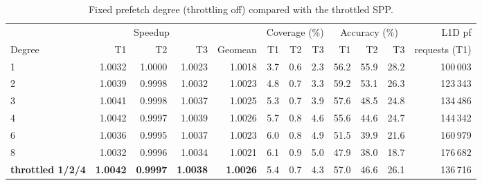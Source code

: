 \documentclass[11pt,a4paper]{article}
\begin{document}
\begin{table}[H]
    \centering
    \small
    \setlength{\tabcolsep}{3pt}
    \begin{tabular}{l rrr r rrr rrr r}
        \toprule
        & \multicolumn{3}{c}{Speedup} & & \multicolumn{3}{c}{Coverage (\%)} & \multicolumn{3}{c}{Accuracy (\%)} & L1D pf \\
        \cmidrule(lr){2-4}\cmidrule(lr){6-8}\cmidrule(lr){9-11}
        Degree & T1 & T2 & T3 & Geomean & T1 & T2 & T3 & T1 & T2 & T3 & requests (T1) \\
        \midrule
        1 & 1.0032 & 1.0000 & 1.0023 & 1.0018 & 3.7 & 0.6 & 2.3 & 56.2 & 55.9 & 28.2 & 100\,003 \\
        2 & 1.0039 & 0.9998 & 1.0032 & 1.0023 & 4.8 & 0.7 & 3.3 & 59.2 & 53.1 & 26.3 & 123\,343 \\
        3 & 1.0041 & 0.9998 & 1.0037 & 1.0025 & 5.3 & 0.7 & 3.9 & 57.6 & 48.5 & 24.8 & 134\,486 \\
        4 & 1.0042 & 0.9997 & 1.0039 & 1.0026 & 5.7 & 0.8 & 4.6 & 55.6 & 44.6 & 24.7 & 144\,342 \\
        6 & 1.0036 & 0.9995 & 1.0037 & 1.0023 & 6.0 & 0.8 & 4.9 & 51.5 & 39.9 & 21.6 & 160\,979 \\
        8 & 1.0032 & 0.9996 & 1.0034 & 1.0021 & 6.1 & 0.9 & 5.0 & 47.9 & 38.0 & 18.7 & 176\,682 \\
        \midrule
        \textbf{throttled 1/2/4} & \textbf{1.0042} & \textbf{0.9997} & \textbf{1.0038} & \textbf{1.0026} & 5.4 & 0.7 & 4.3 & 57.0 & 46.6 & 26.1 & 136\,716 \\
        \bottomrule
    \end{tabular}
    \caption{Fixed prefetch degree (throttling off) compared with the throttled SPP.}
    \label{tab:spp-fixed-deg}
\end{table}
\end{document}
